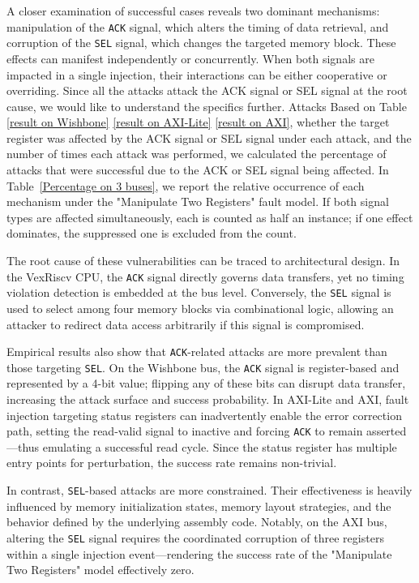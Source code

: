 A closer examination of successful cases reveals two dominant mechanisms: manipulation of the \texttt{ACK} signal, which alters the timing of data retrieval, and corruption of the \texttt{SEL} signal, which changes the targeted memory block. These effects can manifest independently or concurrently. When both signals are impacted in a single injection, their interactions can be either cooperative or overriding. Since all the attacks attack the ACK signal or SEL signal at the root cause, we would like to understand the specifics further. Attacks Based on Table \ref{result on Wishbone} \ref{result on AXI-Lite} \ref{result on AXI}, whether the target register was affected by the ACK signal or SEL signal under each attack, and the number of times each attack was performed, we calculated the percentage of attacks that were successful due to the ACK or SEL signal being affected. In Table~\ref{Percentage on 3 buses}, we report the relative occurrence of each mechanism under the "Manipulate Two Registers" fault model. If both signal types are affected simultaneously, each is counted as half an instance; if one effect dominates, the suppressed one is excluded from the count.

The root cause of these vulnerabilities can be traced to architectural design. In the VexRiscv CPU, the \texttt{ACK} signal directly governs data transfers, yet no timing violation detection is embedded at the bus level. Conversely, the \texttt{SEL} signal is used to select among four memory blocks via combinational logic, allowing an attacker to redirect data access arbitrarily if this signal is compromised.

Empirical results also show that \texttt{ACK}-related attacks are more prevalent than those targeting \texttt{SEL}. On the Wishbone bus, the \texttt{ACK} signal is register-based and represented by a 4-bit value; flipping any of these bits can disrupt data transfer, increasing the attack surface and success probability. In AXI-Lite and AXI, fault injection targeting status registers can inadvertently enable the error correction path, setting the read-valid signal to inactive and forcing \texttt{ACK} to remain asserted—thus emulating a successful read cycle. Since the status register has multiple entry points for perturbation, the success rate remains non-trivial.

In contrast, \texttt{SEL}-based attacks are more constrained. Their effectiveness is heavily influenced by memory initialization states, memory layout strategies, and the behavior defined by the underlying assembly code. Notably, on the AXI bus, altering the \texttt{SEL} signal requires the coordinated corruption of three registers within a single injection event—rendering the success rate of the "Manipulate Two Registers" model effectively zero.

